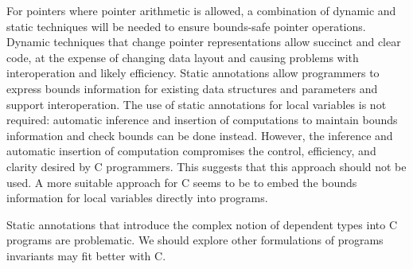 For pointers where pointer arithmetic is allowed, a combination of
dynamic and static techniques will be needed to ensure bounds-safe pointer
operations. Dynamic techniques that change pointer representations allow
succinct and clear code, at the expense of changing data layout and
causing problems with interoperation and likely efficiency. Static
annotations allow programmers to express bounds information for existing
data structures and parameters and support interoperation. The use of
static annotations for local variables is not required: automatic
inference and insertion of computations to maintain bounds information
and check bounds can be done instead. However, the inference and
automatic insertion of computation compromises the control, efficiency,
and clarity desired by C programmers. This suggests that this approach
should not be used. A more suitable approach for C seems to be to embed
the bounds information for local variables directly into programs.

Static annotations that introduce the complex notion of dependent types
into C programs are problematic. We should explore other formulations of
programs invariants may fit better with C.